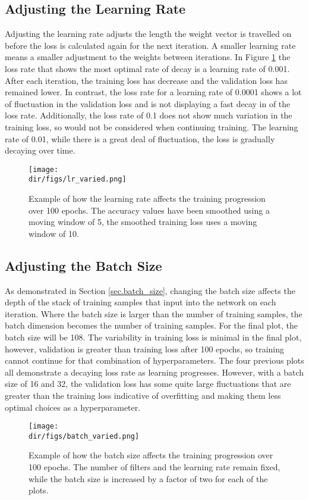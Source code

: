 \subsection{Adjusting the Learning Rate}
Adjusting the learning rate adjusts the length the weight vector is travelled on before the loss is calculated again for the next iteration. A smaller learning rate means a smaller adjustment to the weights between iterations. In Figure \ref{fig.lr_varied} the loss rate that shows the most optimal rate of decay is a learning rate of 0.001. After each iteration, the training loss has decrease and the validation loss has remained lower. In contrast, the loss rate for a learning rate of 0.0001 shows a lot of fluctuation in the validation loss and is not displaying a fast decay in of the loss rate. Additionally, the loss rate of 0.1 does not show much variation in the training loss, so would not be considered when continuing training. The learning rate of 0.01, while there is a great deal of fluctuation, the loss is gradually decaying over time. 
\begin{figure}[htpb]
    \centering
    \texttt{[image: \\dir/figs/lr\_varied.png]}
    \caption[Example of the affect of changing the learning rate]{Example of how the learning rate affects the training progression over 100 epochs. The accuracy values have been smoothed using a moving window of 5, the smoothed training loss uses a moving window of 10.}
    \label{fig.lr_varied}
\end{figure}
\subsection{Adjusting the Batch Size}
As demonstrated in Section \ref{sec.batch_size}, changing the batch size affects the depth of the stack of training samples that input into the network on each iteration. Where the batch size is larger than the number of training samples, the batch dimension becomes the number of training samples. For the final plot, the batch size will be 108. The variability in training loss is minimal in the final plot, however, validation is greater than training loss after 100 epochs, so training cannot continue for that combination of hyperparameters. The four previous plots all demonstrate a decaying loss rate as learning progresses. However, with a batch size of 16 and 32, the validation loss has some quite large fluctuations that are greater than the training loss indicative of overfitting and making them less optimal choices as a hyperparameter. 
\begin{figure}[htpb]
    \centering
    \texttt{[image: \\dir/figs/batch\_varied.png]}
    \caption[Example of the affect of changing the batch size]{Example of how the batch size affects the training progression over 100 epochs. The number of filters and the learning rate remain fixed, while the batch size is increased by a factor of two for each of the plots.}
    \label{fig.batch_varied}
\end{figure}
